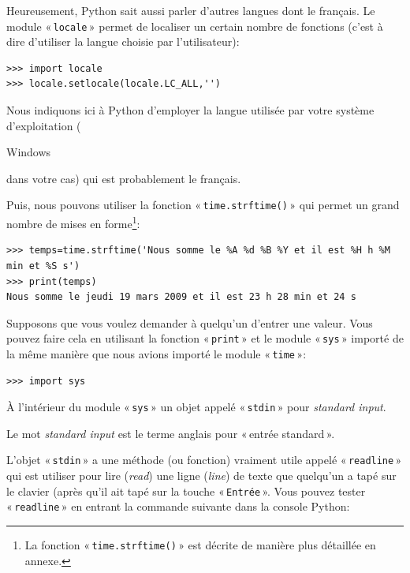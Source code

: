 Heureusement, Python sait aussi parler d'autres langues dont le français. Le module « \texttt{locale} » permet de localiser un certain nombre de fonctions (c'est à dire d'utiliser la langue choisie par l'utilisateur):

\begin{Verbatim}[frame=single,rulecolor=\color{mbleu}, label=à taper]
>>> import locale
>>> locale.setlocale(locale.LC_ALL,'')
\end{Verbatim}

Nous indiquons ici à Python d'employer la langue utilisée par votre système d'exploitation (\begin{WINDOWS}Windows\end{WINDOWS} dans votre cas) qui est probablement le français.

Puis, nous pouvons utiliser la fonction « \texttt{time.strftime()} » qui permet un grand nombre de mises en forme\footnote{La fonction « \texttt{time.strftime()} » est décrite de manière plus détaillée en annexe.}:

\begin{small}
\begin{Verbatim}[frame=single,rulecolor=\color{mbleu}, label=à taper]
>>> temps=time.strftime('Nous somme le %A %d %B %Y et il est %H h %M min et %S s')
>>> print(temps)
Nous somme le jeudi 19 mars 2009 et il est 23 h 28 min et 24 s
\end{Verbatim}
\end{small}

Supposons que vous voulez demander à quelqu'un d'entrer une valeur. Vous pouvez faire cela en utilisant la fonction
« \texttt{print} » et le module « \texttt{sys} » importé de la même manière que nous avions importé le module « \texttt{time} »: 

\begin{Verbatim}[frame=single,rulecolor=\color{mbleu}, label=à taper]
>>> import sys
\end{Verbatim}

À l'intérieur du module « \texttt{sys} » un objet appelé « \texttt{stdin} » pour \emph{standard input}.

Le mot \emph{standard input} est le terme anglais pour « entrée standard ».

L'objet « \texttt{stdin} » a une méthode (ou fonction) vraiment utile appelé  « \texttt{readline} » qui est utiliser pour lire (\emph{read}) une ligne (\emph{line}) de texte que quelqu'un a tapé sur le clavier (après qu'il ait tapé sur la touche « \texttt{Entrée} ». Vous pouvez tester « \texttt{readline} » en entrant la commande suivante dans la console Python:

